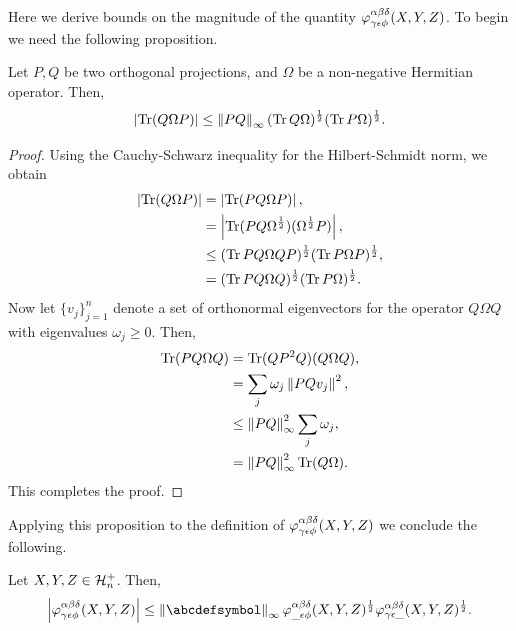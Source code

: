 \documentclass[notitlepage, 11pt, letterpaper]{amsart}
\begin{document}
Here we derive bounds on the magnitude of the quantity $\varphi^{\alpha \beta \delta}_{\gamma \epsilon \phi}(X, Y, Z)$.
To begin we need the following proposition.
\begin{prop}\label{prop:cauchy_schwarz_ineq_double_proj}
    Let $P, Q$ be two orthogonal projections, and $\Omega$ be a non-negative Hermitian operator.
    Then,
    \begin{equation}
        \label{eq:cauchy_schwarz_ineq_double_proj}
        \left|\operatorname{Tr}(Q \Omega P)\right| \leq \left\lVert PQ\right\rVert_{\infty} (\operatorname{Tr} Q\Omega)^{\frac{1}{2}}(\operatorname{Tr} P\Omega )^{\frac{1}{2}}.
    \end{equation}
\end{prop}
\begin{proof}
    Using the Cauchy-Schwarz inequality for the Hilbert-Schmidt norm, we obtain
    \begin{align}
        \begin{split}
            \left|\operatorname{Tr}(Q \Omega P)\right|
            &= \left|\operatorname{Tr}(P Q \Omega P)\right|, \\
            &= \left|\operatorname{Tr}(P Q \Omega^{\frac{1}{2}}) (\Omega^{\frac{1}{2}} P)\right|, \\
            &\leq (\operatorname{Tr} P Q \Omega Q P)^{\frac{1}{2}} (\operatorname{Tr} P \Omega P)^{\frac{1}{2}}, \\
            &= (\operatorname{Tr} P Q \Omega Q)^{\frac{1}{2}} (\operatorname{Tr} P \Omega)^{\frac{1}{2}}.
        \end{split}
    \end{align}
    Now let $\{ v_j \}_{j=1}^{n}$ denote a set of orthonormal eigenvectors for the operator $Q \Omega Q$ with eigenvalues $\omega_j \geq 0$.
    Then,
    \begin{align}
        \begin{split}
            \operatorname{Tr}(P Q \Omega Q)
            &= \operatorname{Tr} (Q P^2 Q)(Q \Omega Q), \\
            &= \sum_j \omega_j \left\lVert P Q v_j\right\rVert^2, \\
            &\leq \left\lVert P Q\right\rVert_\infty^2  \sum_{j} \omega_j, \\
            &= \left\lVert P Q\right\rVert_\infty^2 \operatorname{Tr}(Q \Omega).
        \end{split}
    \end{align}
    This completes the proof.
\end{proof}
Applying this proposition to the definition of $\varphi^{\alpha\beta\delta}_{\gamma\epsilon\phi}(X,Y,Z)$ we conclude the following.
\begin{prop}
    \label{prop:varphi_tet_main_ineq}
    Let $X,Y,Z \in \mathcal H^{+}_{n}$. Then,
    \begin{equation}
        \abs{\vp^{\ya\yb\yd}_{\yc\ye\yf}(X,Y,Z)} \leq \norm{\abcdefsymbol}_{\infty} \vp^{\ya\yb\yd}_{\_\ye\yf}(X,Y,Z)^{\frac{1}{2}} \vp^{\ya\yb\yd}_{\yc\ye\_}(X,Y,Z)^{\frac{1}{2}}.
    \end{equation}
\end{prop}
\end{document}
